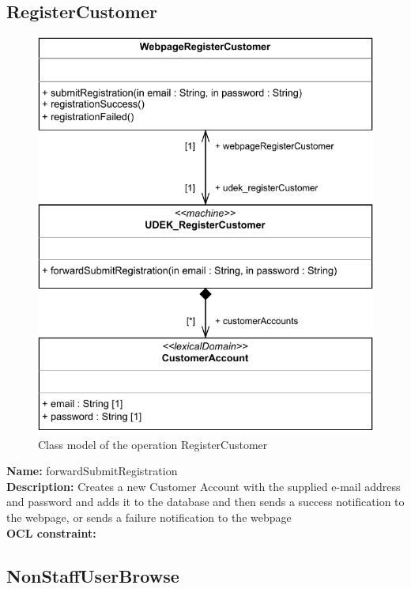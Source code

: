 \documentclass[a4paper,10pt,titlepage,bibtotoc,bibtotocnumbered]{scrreprt}
\begin{document}
\subsection{RegisterCustomer}

\begin{figure}[H]
    \centering
    \includegraphics[]{figures/06/a06_class_diagram_RegisterCustomer.pdf}
    \caption{Class model of the operation RegisterCustomer}
    \label{figure:operation_RegisterCustomer_class_diagram}
\end{figure}

\textbf{Name:} forwardSubmitRegistration
\\
\textbf{Description:} Creates a new Customer Account with the supplied e-mail address and password and adds it to the database and then sends a success notification to the webpage, or sends a failure notification to the webpage
\\
\textbf{OCL constraint:}


\subsection{NonStaffUserBrowse}
\end{document}
